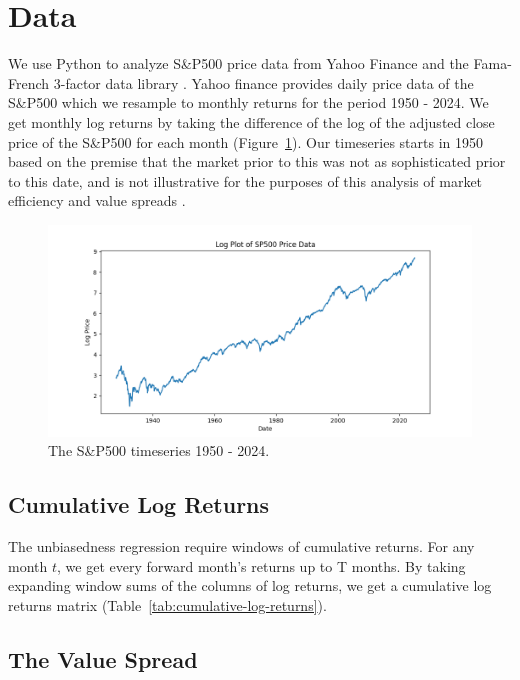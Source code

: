 \section{Data}
\label{sec:data}

We use Python \citep{python3} to analyze S\&P500 price data from Yahoo Finance \citep{yahoo_finance_gspc} and the Fama-French 3-factor data library \citep{french_website}.
Yahoo finance provides daily price data of the S\&P500 which we resample to monthly returns for the period 1950 - 2024. We get monthly log returns by taking the
difference of the log of the adjusted close price of the S\&P500 for each month (Figure~\ref{fig:sp500-returns}). Our timeseries starts in 1950
based on the premise that the market prior to this was not as sophisticated prior to this date,
 and is not illustrative for the purposes of this analysis of market efficiency and value spreads \citep{asness_2024}.

\begin{figure}[h!]
    \centering
    \includegraphics[width=1\textwidth]{../data/03-analysis_data_visuals/sp500_log_price.png}
    \caption{The S\&P500 timeseries 1950 - 2024.}
    \label{fig:sp500-returns}
\end{figure}

\subsection{Cumulative Log Returns}

The unbiasedness regression require windows of cumulative returns. For any month $t$, we get every forward month's returns up to T months.
By taking expanding window sums of the columns of log returns, we get a cumulative log returns matrix (Table~\ref{tab:cumulative-log-returns}).

\subsection{The Value Spread}

